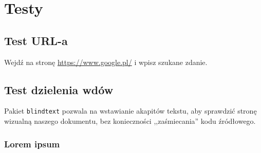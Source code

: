 \chapter{Testy}

\section{Test URL-a}

Wejdź na stronę \url{https://www.google.pl/} i wpisz szukane zdanie.

\clearpage

\section{Test dzielenia wdów}

Pakiet \texttt{blindtext} pozwala na wstawianie akapitów tekstu, aby sprawdzić stronę wizualną naszego dokumentu, bez konieczności ,,zaśmiecania'' kodu źródłowego.

\blindtext[5]

\subsection{Lorem ipsum}

\blindtext
